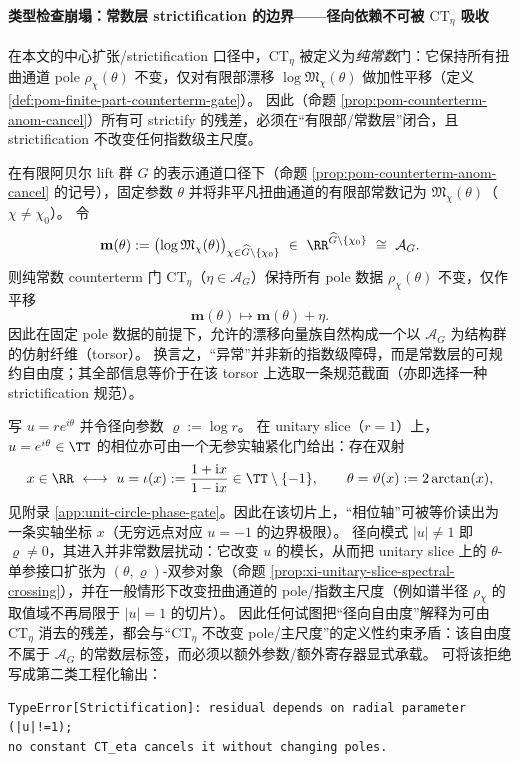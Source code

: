 \paragraph{类型检查崩塌：常数层 strictification 的边界——径向依赖不可被 \texorpdfstring{$\mathrm{CT}_\eta$}{CT} 吸收}
在本文的中心扩张/strictification 口径中，\(\mathrm{CT}_\eta\) 被定义为\emph{纯常数}门：它保持所有扭曲通道 pole \(\rho_\chi(\theta)\) 不变，仅对有限部漂移 \(\log\mathfrak{M}_\chi(\theta)\) 做加性平移（定义 \ref{def:pom-finite-part-counterterm-gate}）。
因此（命题 \ref{prop:pom-counterterm-anom-cancel}）所有可 strictify 的残差，必须在“有限部/常数层”闭合，且 strictification 不改变任何指数级主尺度。
\begin{remark}\label{rem:xi-finite-part-drift-torsor}
在有限阿贝尔 lift 群 \(G\) 的表示通道口径下（命题 \ref{prop:pom-counterterm-anom-cancel} 的记号），固定参数 \(\theta\) 并将非平凡扭曲通道的有限部常数记为 \(\mathfrak{M}_\chi(\theta)\)（\(\chi\neq\chi_0\)）。
令
\[
\mathbf{m}(\theta):=\bigl(\log\mathfrak{M}_\chi(\theta)\bigr)_{\chi\in\widehat G\setminus\{\chi_0\}}
\ \in\ \RR^{\widehat G\setminus\{\chi_0\}}\ \cong\ \mathcal{A}_G.
\]
则纯常数 counterterm 门 \(\mathrm{CT}_\eta\)（\(\eta\in\mathcal{A}_G\)）保持所有 pole 数据 \(\rho_\chi(\theta)\) 不变，仅作平移
\[
\mathbf{m}(\theta)\longmapsto \mathbf{m}(\theta)+\eta.
\]
因此在固定 pole 数据的前提下，允许的漂移向量族自然构成一个以 \(\mathcal{A}_G\) 为结构群的仿射纤维（torsor）。
换言之，“异常”并非新的指数级障碍，而是常数层的可规约自由度；其全部信息等价于在该 torsor 上选取一条规范截面（亦即选择一种 strictification 规范）。
\end{remark}
\par
写 \(u=re^{i\theta}\) 并令径向参数 \(\varrho:=\log r\)。
在 unitary slice（\(r=1\)）上，\(u=e^{i\theta}\in\TT\) 的相位亦可由一个无参实轴紧化门给出：存在双射
\[
x\in\RR\ \longleftrightarrow\ u=\iota(x):=\frac{1+\mathrm{i}x}{1-\mathrm{i}x}\in\TT\setminus\{-1\},
\qquad
\theta=\vartheta(x):=2\arctan(x),
\]
见附录 \ref{app:unit-circle-phase-gate}。因此在该切片上，“相位轴”可被等价读出为一条实轴坐标 \(x\)（无穷远点对应 \(u=-1\) 的边界极限）。
径向模式 \(|u|\neq 1\) 即 \(\varrho\neq 0\)，其进入并非常数层扰动：它改变 \(u\) 的模长，从而把 unitary slice 上的 \(\theta\)-单参接口扩张为 \((\theta,\varrho)\)-双参对象（命题 \ref{prop:xi-unitary-slice-spectral-crossing}），并在一般情形下改变扭曲通道的 pole/指数主尺度（例如谱半径 \(\rho_\chi\) 的取值域不再局限于 \(|u|=1\) 的切片）。
因此任何试图把“径向自由度”解释为可由 \(\mathrm{CT}_\eta\) 消去的残差，都会与“\(\mathrm{CT}_\eta\) 不改变 pole/主尺度”的定义性约束矛盾：该自由度不属于 \(\mathcal{A}_G\) 的常数层标签，而必须以额外参数/额外寄存器显式承载。
可将该拒绝写成第二类工程化输出：
\begin{verbatim}
TypeError[Strictification]: residual depends on radial parameter (|u|!=1);
no constant CT_eta cancels it without changing poles.
\end{verbatim}

